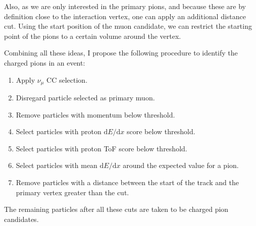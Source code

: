 Also, as we are only interested in the primary pions, and because these are by definition close to the interaction vertex, one can apply an additional distance cut. Using the start position of the muon candidate, we can restrict the starting point of the pions to a certain volume around the vertex.

Combining all these ideas, I propose the following procedure to identify the charged pions in an event:
\begin{enumerate}
    \item Apply $\nu_{\mu}$ CC selection.
    \item Disregard particle selected as primary muon.
    \item Remove particles with momentum below threshold.
    \item Select particles with proton $\mathrm{d}E/\mathrm{d}x$ score below threshold.
    \item Select particles with proton ToF score below threshold.
    \item Select particles with mean $\mathrm{d}E/\mathrm{d}x$ around the expected value for a pion.
    \item Remove particles with a distance between the start of the track and the primary vertex greater than the cut.
\end{enumerate}
The remaining particles after all these cuts are taken to be charged pion candidates.

